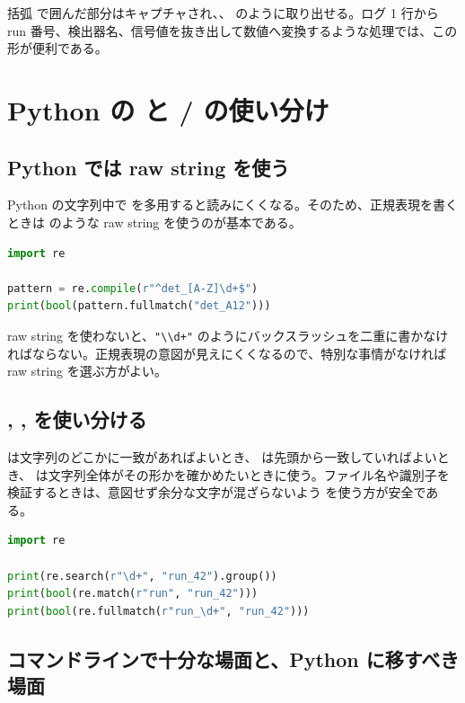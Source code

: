 括弧  で囲んだ部分はキャプチャされ、、 のように取り出せる。ログ 1 行から run 番号、検出器名、信号値を抜き出して数値へ変換するような処理では、この形が便利である。

\section{Python の  と / の使い分け}

\subsection{Python では raw string を使う}

Python の文字列中で \code{\textbackslash} を多用すると読みにくくなる。そのため、正規表現を書くときは  のような raw string を使うのが基本である。

\begin{lstlisting}[language=Python]
import re

pattern = re.compile(r"^det_[A-Z]\d+$")
print(bool(pattern.fullmatch("det_A12")))
\end{lstlisting}

raw string を使わないと、\texttt{"\textbackslash\textbackslash d+"} のようにバックスラッシュを二重に書かなければならない。正規表現の意図が見えにくくなるので、特別な事情がなければ raw string を選ぶ方がよい。

\subsection{, ,  を使い分ける}

 は文字列のどこかに一致があればよいとき、 は先頭から一致していればよいとき、 は文字列全体がその形かを確かめたいときに使う。ファイル名や識別子を検証するときは、意図せず余分な文字が混ざらないよう  を使う方が安全である。

\begin{lstlisting}[language=Python]
import re

print(re.search(r"\d+", "run_42").group())
print(bool(re.match(r"run", "run_42")))
print(bool(re.fullmatch(r"run_\d+", "run_42")))
\end{lstlisting}

\subsection{コマンドラインで十分な場面と、Python に移すべき場面}

